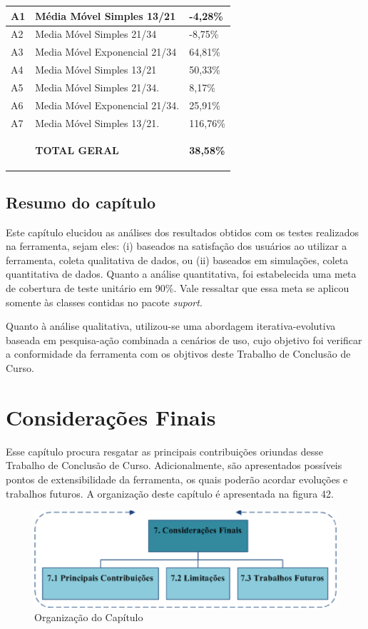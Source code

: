 \begin{description}
\begin{center}
\begin{longtable}{| p{2cm} | p{10cm} |p{2cm} |}
	A1 & Média Móvel Simples 13/21 & -4,28\% \\ \hline
	A2 & Media Móvel Simples 21/34 & -8,75\% \\ \hline
	A3 & Media Móvel Exponencial 21/34 & 64,81\% \\ \hline
	A4 & Media Móvel Simples  13/21 & 50,33\% \\ \hline
	A5 & Media Móvel Simples 21/34. & 8,17\% \\ \hline
	A6 & Media Móvel Exponencial 21/34. & 25,91\% \\ \hline
	A7 & Media Móvel Simples  13/21. & 116,76\% \\ \hline
	{} & \textbf{TOTAL GERAL} & \textbf{38,58\%} 
	
\label{t11}
\end{longtable}
\end{center} 
\end{description}

\section{Resumo do capítulo}

Este capítulo elucidou as análises dos resultados obtidos com os testes realizados na ferramenta, sejam eles: (i) baseados na satisfação dos usuários ao utilizar a ferramenta, coleta qualitativa de dados, ou (ii) baseados em simulações, coleta quantitativa de dados. Quanto a análise quantitativa, foi estabelecida uma meta de cobertura de teste unitário em 90\%. Vale ressaltar que essa meta se aplicou somente às classes contidas no pacote \textit{suport}. 

Quanto à análise qualitativa, utilizou-se uma abordagem iterativa-evolutiva baseada em pesquisa-ação combinada a cenários de uso, cujo objetivo foi verificar a conformidade da ferramenta com os objtivos deste Trabalho de Conclusão de Curso.


\newpage
\chapter[CONSIDERAÇÕES FINAIS]{Considerações Finais}

Esse capítulo procura resgatar as principais contribuições oriundas desse Trabalho de Conclusão de Curso. Adicionalmente, são apresentados possíveis pontos de extensibilidade da ferramenta, os quais poderão acordar evoluções e trabalhos futuros. A organização deste capítulo é apresentada na figura 42.

\begin{figure}[h!]
\centering
\label{f10}
\includegraphics[width=1\textwidth]{figuras/cap7}
\caption{Organização do Capítulo}
\end{figure}
\FloatBarrier

